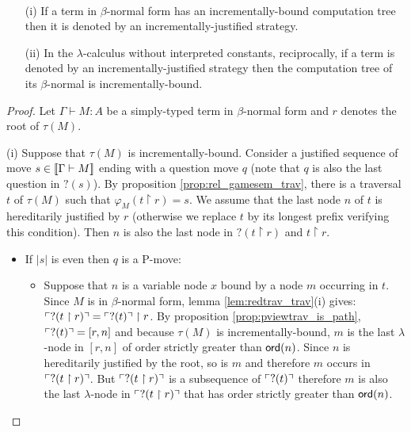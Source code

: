 \begin{prop} \
\label{prop:incrbound_imp_incrjustified}
\begin{enumerate}
\item[(i)] If a term in $\beta$-normal form has an incrementally-bound computation tree then it is denoted by an incrementally-justified strategy.
\item[(ii)] In the $\lambda$-calculus without interpreted constants, reciprocally, if a term is denoted by an incrementally-justified strategy then
the computation tree of its $\beta$-normal is incrementally-bound.
\end{enumerate}
\end{prop}

\begin{proof}
Let $\Gamma \vdash M : A$ be a simply-typed term in $\beta$-normal
form and $r$ denotes the root of $\tau(M)$.

\noindent (i) Suppose that $\tau(M)$ is incrementally-bound.
Consider a justified sequence of move $s \in {[\![\Gamma \vdash M ]\!]}$
ending with a question move $q$ (note that $q$ is also the last
question in $?(s)$). By proposition \ref{prop:rel_gamesem_trav},
there is a traversal $t$ of $\tau(M)$ such that $\varphi_{M}(t
\upharpoonright r) = s$. We assume that the last node $n$ of $t$ is
hereditarily justified by $r$ (otherwise we replace $t$ by its
longest prefix verifying this condition). Then $n$ is also the last
node in $?(t \upharpoonright r)$ and $t \upharpoonright r$.

\begin{itemize}
\item If $|s|$ is even then $q$ is a P-move:
\begin{itemize}
\item Suppose that $n$ is a variable node $x$ bound by a node $m$ occurring in $t$.
Since $M$ is in $\beta$-normal form, lemma \ref{lem:redtrav_trav}(i)
gives: $ \ulcorner ?(t \upharpoonright r) \urcorner = \ulcorner ?(t) \urcorner
\upharpoonright  r$. By proposition \ref{prop:pviewtrav_is_path},
$\ulcorner ?(t) \urcorner = [r,n]$ and because $\tau(M)$ is incrementally-bound,
$m$ is the last $\lambda$-node in $[r,n]$ of order strictly greater
than ${\sf ord}(n)$. Since $n$ is hereditarily justified by the root, so
is $m$ and therefore $m$ occurs in $\ulcorner ?(t \upharpoonright r) \urcorner$.
But $\ulcorner ?(t \upharpoonright r) \urcorner$ is a subsequence of
$\ulcorner ?(t) \urcorner$ therefore $m$ is also the last $\lambda$-node in
$\ulcorner ?(t \upharpoonright  r) \urcorner$ that has order strictly greater
than ${\sf ord}(n)$.


\end{itemize}
\end{itemize}
\end{proof}
